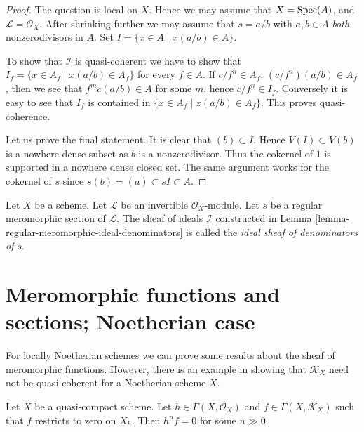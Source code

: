 \begin{proof}
The question is local on $X$.
Hence we may assume that $X = \mathop{\mathrm{Spec}}(A)$,
and $\mathcal{L} = \mathcal{O}_X$. After shrinking further
we may assume that $s = a/b$ with $a, b \in A$ {\it both}
nonzerodivisors in $A$. Set $I = \{x \in A \mid x(a/b) \in A\}$.

\medskip\noindent
To show that $\mathcal{I}$ is quasi-coherent we have to show
that $I_f = \{x \in A_f \mid x(a/b) \in A_f\}$ for every
$f \in A$. If $c/f^n \in A_f$, $(c/f^n)(a/b) \in A_f$, then we see
that $f^mc(a/b) \in A$ for some $m$, hence $c/f^n \in I_f$.
Conversely it is easy to see that $I_f$ is contained in
$\{x \in A_f \mid x(a/b) \in A_f\}$. This proves quasi-coherence.

\medskip\noindent
Let us prove the final statement. It is clear that $(b) \subset I$.
Hence $V(I) \subset V(b)$ is a nowhere dense subset as $b$ is
a nonzerodivisor. Thus the cokernel of $1$ is supported in a nowhere
dense closed set. The same argument works for the cokernel
of $s$ since $s(b) = (a) \subset sI \subset A$.
\end{proof}

\begin{definition}
\label{definition-regular-meromorphic-ideal-denominators}
Let $X$ be a scheme.
Let $\mathcal{L}$ be an invertible $\mathcal{O}_X$-module.
Let $s$ be a regular meromorphic section of $\mathcal{L}$.
The sheaf of ideals $\mathcal{I}$ constructed in
Lemma \ref{lemma-regular-meromorphic-ideal-denominators}
is called the {\it ideal sheaf of denominators of $s$}.
\end{definition}




\section{Meromorphic functions and sections; Noetherian case}
\label{section-meromorphic-noetherian}

\noindent
For locally Noetherian schemes we can prove some results about the
sheaf of meromorphic functions. However, there is an example in
\cite{misconceptions} showing that $\mathcal{K}_X$ need not be quasi-coherent
for a Noetherian scheme $X$.

\begin{lemma}
\label{lemma-meromorphic-section-restricts-to-zero}
Let $X$ be a quasi-compact scheme. Let $h \in \Gamma(X, \mathcal{O}_X)$ and
$f \in \Gamma(X, \mathcal{K}_X)$ such that $f$ restricts
to zero on $X_h$. Then $h^n f = 0$ for some $n \gg 0$.
\end{lemma}

